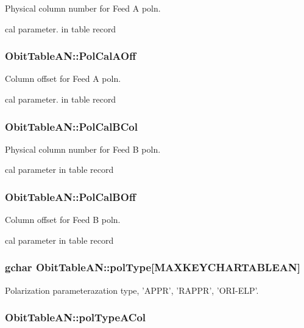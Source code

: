 Physical column number for Feed A poln. 

cal parameter. in table record 
\subsubsection{ {\bf Obit\-Table\-AN::Pol\-Cal\-AOff}}\label{structObitTableAN_o60}


Column offset for Feed A poln. 

cal parameter. in table record 
\subsubsection{ {\bf Obit\-Table\-AN::Pol\-Cal\-BCol}}\label{structObitTableAN_o65}


Physical column number for Feed B poln. 

cal parameter in table record 
\subsubsection{ {\bf Obit\-Table\-AN::Pol\-Cal\-BOff}}\label{structObitTableAN_o64}


Column offset for Feed B poln. 

cal parameter in table record 
\subsubsection{\setlength{\rightskip}{0pt plus 5cm}gchar {\bf Obit\-Table\-AN::pol\-Type}[MAXKEYCHARTABLEAN]}\label{structObitTableAN_o32}


Polarization parameterazation type, 'APPR', 'RAPPR', 'ORI-ELP'. 

\subsubsection{ {\bf Obit\-Table\-AN::pol\-Type\-ACol}}\label{structObitTableAN_o59}



